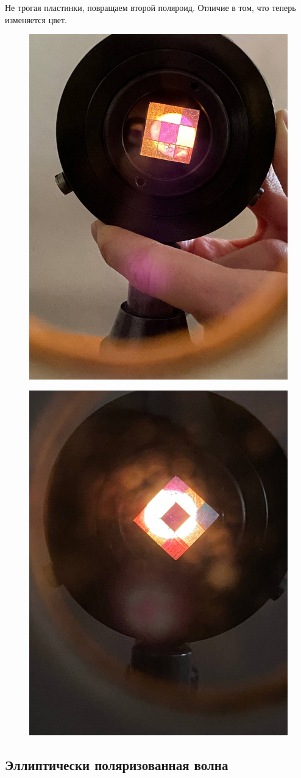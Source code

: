 \documentclass[a4paper, 12pt]{article}%
\begin{document}
	Не трогая пластинки, повращаем второй поляроид. Отличие в том, что теперь изменяется цвет.
	\begin{figure}[H]
		\centering
		\begin{minipage}{.5\textwidth}
			\centering
			\includegraphics[width=0.49\linewidth]{photo_2023-03-03_23-10-44}
			\label{1}
		\end{minipage}%
		\begin{minipage}{.5\textwidth}
			\centering
			\includegraphics[width=0.49\linewidth]{photo_2023-03-03_23-10-46}
			\label{2}
		\end{minipage}
	\end{figure}
	
	
	\subsection{Эллиптически поляризованная волна}
	
\end{document}
